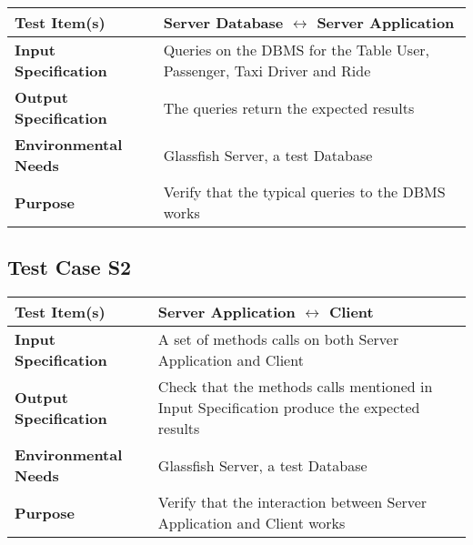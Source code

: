    	\begin{tabular}{p{} p{}}
   		\hline
   		\textbf{Test Item(s)} & Server Database $ \longleftrightarrow $ Server Application  \\
   		\hline
   		\textbf{Input Specification} & Queries on the DBMS for the Table User, Passenger, Taxi Driver and Ride\\
   		\hline
   		\textbf{Output Specification} & The queries return the expected results\\
   		\hline
   		\textbf{Environmental Needs} &  Glassfish Server, a test Database\\
   		\hline
   		\textbf{Purpose} & Verify that the typical queries to the DBMS works \\
   		\hline
   	\end{tabular}
   
   
   
   \subsection{Test Case S2}
   
   	\begin{tabular}{p{} p{}}
   		\hline
   		\textbf{Test Item(s)} & Server Application $ \longleftrightarrow $ Client  \\
   		\hline
   		\textbf{Input Specification} & A set of methods calls on both Server Application and Client \\
   		\hline
   		\textbf{Output Specification} & Check that the methods calls mentioned in Input Specification produce the expected results \\
   		\hline
   		\textbf{Environmental Needs} &  Glassfish Server, a test Database\\
   		\hline
   		\textbf{Purpose} & Verify that the interaction between Server Application and Client works \\
   		\hline
   	\end{tabular}
      

